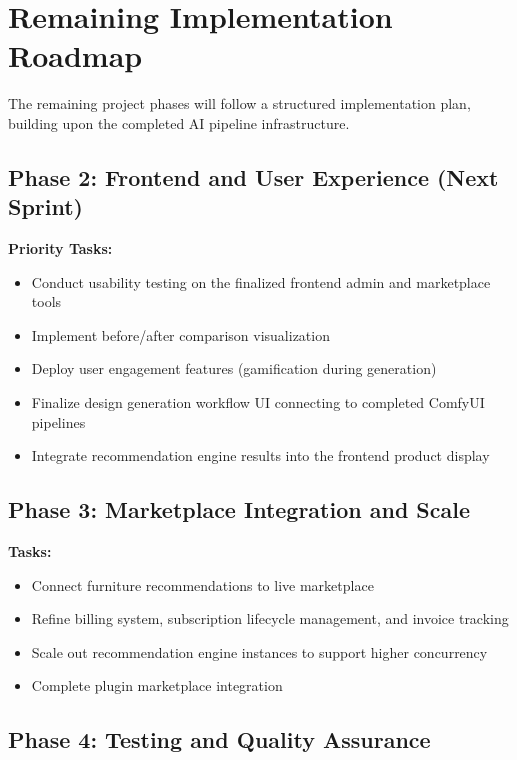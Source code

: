\section{Remaining Implementation Roadmap}
\label{sec:roadmap}

The remaining project phases will follow a structured implementation plan, building upon the completed AI pipeline infrastructure.

\subsection{Phase 2: Frontend and User Experience (Next Sprint)}

\textbf{Priority Tasks:}
\begin{itemize}
    \item Conduct usability testing on the finalized frontend admin and marketplace tools
    \item Implement before/after comparison visualization
    \item Deploy user engagement features (gamification during generation)
    \item Finalize design generation workflow UI connecting to completed ComfyUI pipelines
    \item Integrate recommendation engine results into the frontend product display
\end{itemize}

\subsection{Phase 3: Marketplace Integration and Scale}

\textbf{Tasks:}
\begin{itemize}
    \item Connect furniture recommendations to live marketplace
    \item Refine billing system, subscription lifecycle management, and invoice tracking
    \item Scale out recommendation engine instances to support higher concurrency
    \item Complete plugin marketplace integration
\end{itemize}

\subsection{Phase 4: Testing and Quality Assurance}


